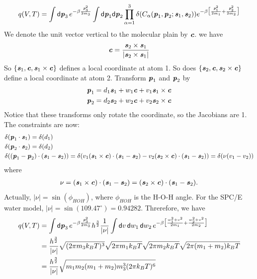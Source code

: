 \documentclass[aip,jcp,a4paper,reprint,onecolumn]{revtex4-1}
\newcommand{\vect}[1]{\textbf{\textit{#1}}}
\newcommand{\dd}[0]{\textsf{d}}
\begin{document}
\begin{align}
  q(V,T) =
  \int\dd\vect p_3\,
  e^{-\beta\frac{\vect p_3^2}{2m_3}}
  \int\dd{\vect p}_1\dd\vect p_2
  \prod_{\alpha=1}^3
  \delta (C_\alpha (\vect p_1,\vect p_2; \vect s_1, \vect s_2))
  e^{-\beta \big[\frac{\vect p_1^2}{2 m_1} + \frac{\vect p_2^2}{2 m_2}\big]}
\end{align}
We denote the unit vector vertical to the molecular plain by $\vect c$. we have
\begin{align}
  \vect c = \frac{\vect s_2\times\vect s_1}{\vert \vect s_2\times\vect s_1\vert}
\end{align}
So $\{\vect s_1, \vect c, \vect s_1\times\vect c\}$ defines a local coordinate
at atom 1. So does $\{\vect s_2, \vect c, \vect s_2\times\vect c\}$ define
a local coordinate at atom 2. Transform $\vect p_1$ and $\vect p_2$ by
\begin{align}
  \vect p_1
  &= 
  d_1\vect s_1 + w_1\vect c + v_1 \vect s_1\times\vect c \\
  \vect p_2
  &=
  d_2\vect s_2 + w_2\vect c + v_2 \vect s_2\times\vect c 
\end{align}
Notice that these transforms only rotate the coordinate, so the Jacobians are 1.
The constraints are now:
\begin{align}
  &\delta(\vect p_1\cdot\vect s_1) = \delta (d_1) \\
  &\delta(\vect p_2\cdot\vect s_2) = \delta (d_2) \\
  &\delta((\vect p_1 - \vect p_2)\cdot(\vect s_1 - \vect s_2))
  = \delta (v_1(\vect s_1\times\vect c)\cdot(\vect s_1-\vect s_2) - 
  v_2(\vect s_2\times\vect c)\cdot(\vect s_1-\vect s_2))
  = \delta (\nu (v_1 - v_2) )
\end{align}
where
\begin{align}
\nu = (\vect s_1\times\vect c)\cdot(\vect s_1-\vect s_2)
= (\vect s_2\times\vect c)\cdot(\vect s_1-\vect s_2).  
\end{align}
Actually, $\vert\nu\vert = \sin(\phi_{HOH})$, where $\phi_{HOH}$ is the
H-O-H angle.
For the SPC/E water model, $\vert\nu\vert = \sin(109.47^{\circ}) = 0.94282$.
Threrefore, we have 
\begin{align}\nonumber
  q(V,T)
  &=
  \int\dd\vect p_3\,
  e^{-\beta\frac{\vect p_3^2}{2m_3}}
  h^{\frac32}
  \frac1{\vert\nu\vert}
  \int\dd v\, \dd w_1\,\dd w_2\,
  e^{-\beta
    \big[
    \frac{w_1^2 + v^2}{2 m_1} + 
    \frac{w_2^2 + v^2}{2 m_2}
    \big]
  } \\
  &=
  \frac{h^{\frac32}}{\vert\nu\vert}
  \sqrt{(2\pi m_3 k_BT)^3}
  \sqrt{2\pi m_1 k_BT}
  \sqrt{2\pi m_2 k_BT}
  \sqrt{2\pi (m_1 + m_2) k_BT}
  \\
  &=
  \frac{h^{\frac32}}{\vert\nu\vert}
  \sqrt{m_1 m_2 (m_1+m_2) m_3^3 (2\pi k_BT)^6}
\end{align}
\end{document}
